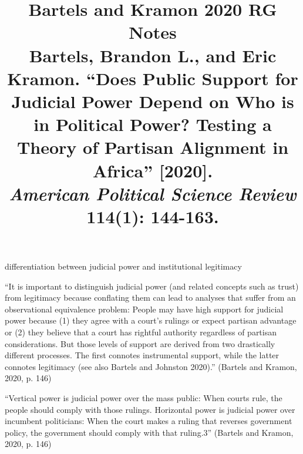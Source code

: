 \documentclass[12pt]{article}
\title{\textbf{Bartels and Kramon 2020 RG Notes}\\
\large Bartels, Brandon L., and Eric Kramon. ``Does Public Support for Judicial Power Depend on Who is in Political Power? Testing a Theory of Partisan Alignment in Africa'' [2020].\\
\textit{American Political Science Review} 114(1): 144-163.}
\author{}
\date{}
\begin{document}
\maketitle

differentiation between judicial power and institutional legitimacy

``It is important to distinguish judicial power (and related concepts such as trust) from legitimacy because conflating them can lead to analyses that suffer from an observational equivalence problem: People may have high support for judicial power because (1) they agree with a court's rulings or expect partisan advantage or (2) they believe that a court has rightful authority regardless of partisan considerations. But those levels of support are derived from two drastically different processes. The first connotes instrumental support, while the latter connotes legitimacy (see also Bartels and Johnston 2020).'' (Bartels and Kramon, 2020, p. 146)

``Vertical power is judicial power over the mass public: When courts rule, the people should comply with those rulings. Horizontal power is judicial power over incumbent politicians: When the court makes a ruling that reverses government policy, the government should comply with that ruling.3'' (Bartels and Kramon, 2020, p. 146)
\end{document}
